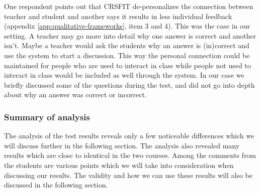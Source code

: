 One respondent points out that CRSFIT de-personalizes the connection between teacher and student and another says it results in less individual feedback (appendix \ref{app:qualitative-frameworks}, item 3 and 4). This was the case in our setting. A teacher may go more into detail why one answer is correct and another isn't. Maybe a teacher would ask the students why an answer is (in)correct and use the system to start a discussion. This way the personal connection could be maintained for people who are used to interact in class while people not used to interact in class would be included as well through the system. In our case we briefly discussed some of the questions during the test, and did not go into depth about why an answer was correct or incorrect.


\subsubsection*{Summary of analysis}
The analysis of the test results reveals only a few noticeable differences which we will discuss further in the following section. The analysis also revealed many results which are close to identical in the two courses. Among the comments from the students are various points which we will take into consideration when discussing our results. The validity and how we can use these results will also be discussed in the following section.

